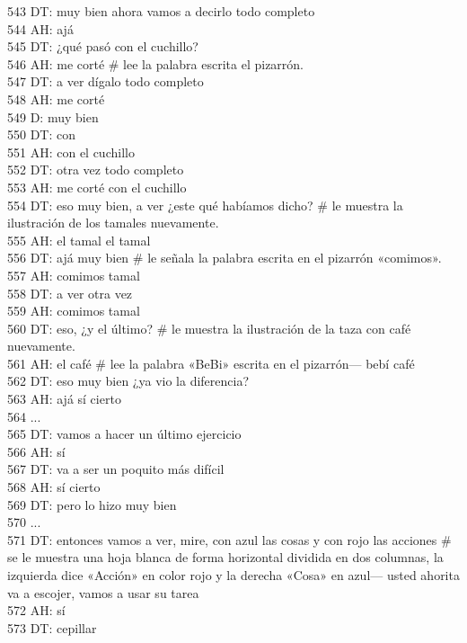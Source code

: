 543 DT: muy bien ahora vamos a decirlo todo completo\\
544 AH: ajá\\
545 DT: ¿qué pasó con el cuchillo?\\
546 AH: me corté \# lee la palabra escrita el pizarrón.\\
547 DT: a ver dígalo todo completo\\
548 AH: me corté\\
549 D: muy bien\\
550 DT: con\\
551 AH: con el cuchillo\\
552 DT: otra vez todo completo\\
553 AH: me corté con el cuchillo\\
554 DT: eso muy bien, a ver ¿este qué habíamos dicho? \# le muestra la ilustración  de los tamales nuevamente.\\
555 AH: el tamal el tamal\\
556 DT: ajá muy bien \# le señala la palabra escrita en el pizarrón «comimos».\\
557 AH: comimos tamal\\
558 DT: a ver otra vez\\
559 AH: comimos tamal\\
560 DT: eso, ¿y el último? \# le muestra la ilustración de la taza con café nuevamente.\\
561 AH: el café \# lee la palabra «BeBi» escrita en el pizarrón--- bebí café\\
562 DT: eso muy bien ¿ya vio la diferencia?\\
563 AH: ajá sí cierto\\
564 ...\\
565 DT: vamos a hacer un último ejercicio\\
566 AH: sí\\
567 DT: va a ser un poquito más difícil\\
568 AH: sí cierto\\
569 DT: pero lo hizo muy bien\\
570 ...\\
571 DT: entonces vamos a ver, mire, con azul las cosas y con rojo las acciones \# se le muestra una hoja blanca de forma horizontal dividida en dos columnas, la izquierda dice «Acción» en color rojo y la derecha «Cosa» en azul--- usted ahorita va a escojer, vamos a usar su tarea\\
572 AH: sí\\
573 DT: cepillar\\
